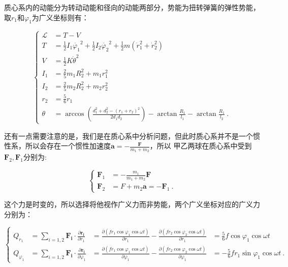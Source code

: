 \documentclass[a4paper,c5size,twoside,UTF8]{ctexart} %
\newcommand{\FS}[2]{\displaystyle\frac{#1}{#2}}
\numberwithin{equation}{section}   %
\begin{document}
质心系内的动能分为转动动能和径向的动能两部分，势能为扭转弹簧的弹性势能，取$r_1$和$\varphi_1$为广义坐标则有：

\begin{equation}
\left\{
\begin{aligned}
	\mathcal{L}&= T-V  \\
	T&= \FS{1}{2}I_1\dot{\varphi_1}^2+\FS{1}{2}I_2\dot{\varphi_2}^2+\FS{1}{2}m\left( \dot{r}_1^2+\dot{r}_2^2 \right)  \\
	V&=\FS{1}{2}K\dot{\theta}^2 \\
	I_1&=\FS{2}{5}m_1R_2^2+m_1r_1^2 \\
	I_2&=\FS{2}{5}m_2R_2^2+m_2r_2^2 \\
	r_2&=\FS{5}{6}r_1 \\
	\theta&= \arccos{\left(\FS{d_1^2+d_2^2-\left(r_1+r_2\right)^2}{2d_1d_2}\right)}-\arctan{\FS{R_1}{l_1}}-\arctan{\FS{R_1}{l_2}} ~.
\end{aligned}
\right.
\end{equation}

还有一点需要注意的是，我们是在质心系中分析问题，但此时质心系并不是一个惯性系，所以会存在一个惯性加速度$\boldsymbol{a}=-\FS{\boldsymbol{F}}{m_1+m_2}$，所以
甲乙两球在质心系中受到$\boldsymbol{F}_2,\boldsymbol{F}_1$分别为:


\begin{equation}
	\left\{
	\begin{aligned}
	\bm{F}_1&=-\FS{m_1}{m_1+m_2}\bm{F} \\
	\bm{F}_2&=F+m_2\bm{a}=-\bm{F}_1 ~.
    \end{aligned}
    \right.
\end{equation}


这个力是时变的，所以选择将他视作广义力而非势能，两个广义坐标对应的广义力分别为：

\begin{equation}
	\left\{
	\begin{aligned}
	Q_{r_1}&=\sum\limits_{i=1,2}\bm{F_i}\cdot \FS{\partial\bm{r_i}}{\partial r_1}&=\FS{\partial\left( fr_1\cos{\varphi_1}\cos{\omega t} \right)}{\partial r_1}
		-\FS{\partial\left( fr_2\cos{\varphi_2}\cos{\omega t} \right)}{\partial r_1}&=\FS{5}{6}f\cos{\varphi_1\cos{\omega t}} \\
	Q_{\varphi_1}&=\sum\limits_{i=1,2}\bm{F_i}\cdot \FS{\partial\bm{r_i}}{\partial \varphi_1}&=\FS{\partial\left( fr_1\cos{\varphi_1}\cos{\omega t} \right)}{\partial \varphi_1}
		-\FS{\partial\left( fr_2\cos{\varphi_2}\cos{\omega t} \right)}{\partial \varphi_1}&=-\FS{5}{6}fr_1\sin{\varphi_1\cos{\omega t}} ~.
    \end{aligned}
    \right.
\end{equation}
\end{document}
